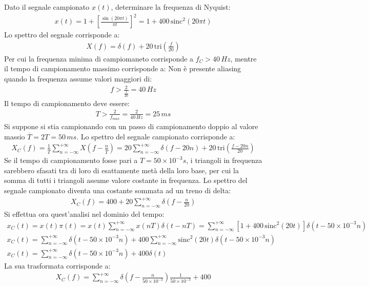 \documentclass{article}
\begin{document}
Dato il segnale campionato $x(t)$, determinare la frequenza di Nyquist: 
\begin{gather*}
    x(t)=1+\left[\displaystyle\frac{\sin(20\pi t)}{\pi t}\right]^2=1+400\,\mbox{sinc}^2\left(20\pi t\right)
\end{gather*}
Lo spettro del segnale corrisponde a:
\begin{gather*}
    X(f)=\displaystyle \delta(f)+20\,\mbox{tri}\left(\frac{f}{20}\right)
\end{gather*}
Per cui la frequenza minima di campiomaneto corrisponde a $f_C>40\,Hz$, mentre il tempo di campionamento massimo corrisponde a:
Non è presente aliasing quando la frequenza assume valori maggiori di:
\begin{gather*}
    f>\displaystyle\frac{2}{\frac{1}{20}}=40\,Hz
\end{gather*}
Il tempo di campionamento deve essere:
\begin{gather}
    T>\displaystyle\frac{2}{f_{max}}=\frac{2}{40\,Hz}=25\,ms
\end{gather}
Si suppone si stia campionando con un passo di campionamento doppio al valore massio $\overline{T}=2T=50\,ms$. Lo spettro del segnale campionato corrisponde a:
\begin{gather*}
    X_C(f)=\displaystyle \frac{1}{\overline{T}}\sum_{n=-\infty}^{+\infty}X\left(f-\frac{n}{\overline{T}}\right)=20\sum_{n=-\infty}^{+\infty}\delta(f-20n)+20\,\mbox{tri}\left(\frac{f-20n}{20}\right)
\end{gather*}
Se il tempo di campionamento fosse pari a $T=50\times10^{-3}s$, i triangoli in frequenza sarebbero sfasati tra di loro di esattamente metà della loro base, per cui la 
somma di tutti i triangoli assume valore costante in frequenza. 
Lo spettro del segnale campionato diventa una costante sommata ad un treno di delta:
\begin{gather}
    X_C(f)=400+20\displaystyle\sum_{n=-\infty}^{+\infty}\delta\left(f-\frac{n}{20}\right)
\end{gather}
Si effettua ora quest'analisi nel dominio del tempo:
\begin{gather*}
    x_C(t)=x(t)\pi(t)=x(t)\displaystyle\sum_{n=-\infty}^{+\infty}x(nT)\delta(t-nT)=\sum_{n=-\infty}^{+\infty}\left[1+400\,\mbox{sinc}^2\left(20t\right)\right]\delta(t-50\times10^{-3}n)\\
    x_C(t)=\displaystyle\sum_{n=-\infty}^{+\infty}\delta(t-50\times10^{-3}n)+400\sum_{n=-\infty}^{+\infty}\mbox{sinc}^2(20t)\delta(t-50\times10^{-3}n)\\
    x_C(t)=\displaystyle\sum_{n=-\infty}^{+\infty}\delta(t-50\times10^{-3}n)+400\delta(t)
\end{gather*}
La sua trasformata corrisponde a:
\begin{gather*}
    X_C(f)=\displaystyle\sum_{n=-\infty}^{+\infty}\delta\left(f-\frac{n}{50\times10^{-3}}\right)\frac{1}{50\times10^{-3}}+400
\end{gather*}
\end{document}
